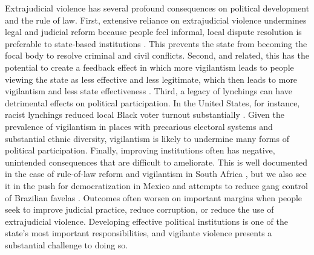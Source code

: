 \documentclass[12pt,ansiapaper]{article}
\begin{document}
Extrajudicial violence has several profound consequences on political development and the rule of law. First, extensive reliance on extrajudicial violence undermines legal and judicial reform because people feel informal, local dispute resolution is preferable to state-based institutions \citep{blair2020peacekeeping}. This prevents the state from becoming the focal body to resolve criminal and civil conflicts. Second, and related, this has the potential to create a feedback effect in which more vigilantism leads to people viewing the state as less effective and less legitimate, which then leads to more vigilantism and less state effectiveness \citep{jung2020lynching}. Third, a legacy of lynchings can have detrimental effects on political participation. In the United States, for instance, racist lynchings reduced local Black voter turnout substantially \citep{jones2017political}. Given the prevalence of vigilantism in places with precarious electoral systems and substantial ethnic diversity, vigilantism is likely to undermine many forms of political participation. Finally, improving institutions often has negative, unintended consequences that are difficult to ameliorate. This is well documented in the case of rule-of-law reform and vigilantism in South Africa \citep{smith2019contradictions}, but we also see it in the push for democratization in Mexico \citep{trejo2021high} and attempts to reduce gang control of Brazilian favelas \citep{magaloni2020killing}. Outcomes often worsen on important margins when people seek to improve judicial practice, reduce corruption, or reduce the use of extrajudicial violence. Developing effective political institutions is one of the state's most important responsibilities, and vigilante violence presents a substantial challenge to doing so. 

\newpage

\setlength{\parindent}{0cm}
\setlength{\parskip}{5pt}


\end{document}
